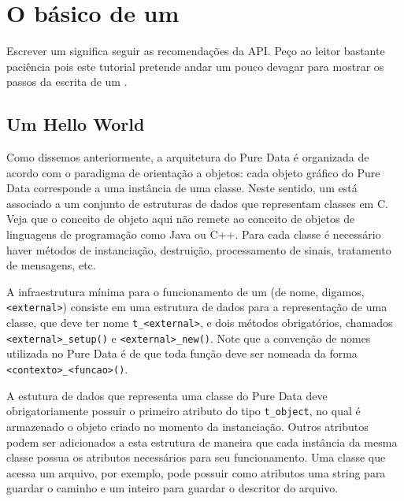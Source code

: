 
\chapter{O básico de um \external}

Escrever um \external significa seguir as recomendações da API. Peço ao leitor
bastante paciência pois este tutorial pretende andar um pouco devagar para
mostrar os passos da escrita de um \external.

\section{Um \external Hello World}

Como dissemos anteriormente, a arquitetura do Pure Data é organizada de acordo
com o paradigma de orientação a objetos: cada objeto gráfico do Pure Data
corresponde a uma instância de uma classe. Neste sentido, um \external está
associado a um conjunto de estruturas de dados que representam classes em C.
Veja que o conceito de objeto aqui não remete ao conceito de objetos de
linguagens de programação como Java ou C++.
Para cada classe é necessário haver métodos de instanciação, destruição,
processamento de sinais, tratamento de mensagens, etc.

A infraestrutura mínima para o funcionamento de um \external (de nome, digamos,
\texttt{<external>}) consiste em uma estrutura de dados para a representação
de uma classe, que deve ter nome \texttt{t\_<external>}, e dois métodos
obrigatórios, chamados \texttt{<external>\_setup()} e
\texttt{<external>\_new()}. Note que a convenção de nomes utilizada no Pure
Data é de que toda função deve ser nomeada da forma
\texttt{<contexto>\_<funcao>()}.

A estutura de dados que representa uma classe do Pure Data deve
obrigatoriamente possuir o primeiro atributo do tipo \texttt{t\_object}, no
qual é armazenado o objeto criado no momento da instanciação.
Outros atributos podem ser adicionados a esta estrutura de maneira que cada
instância da mesma classe possua os atributos necessários para seu
funcionamento.
Uma classe que acessa um arquivo, por exemplo, pode possuir como atributos uma
string para guardar o caminho e um inteiro para guardar o descritor do
arquivo.

